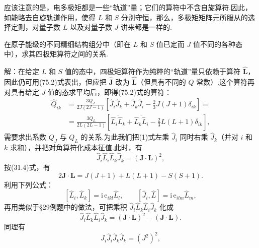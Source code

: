 应该注意的是，电多极矩都是一些“轨道”量；它们的算符中不含自旋算符.因此，如能略去自旋轨道作用，使得 $L$ 和 $S$ 分别守恒，那么，多极矩矩阵元所服从的选择定则，对量子数 $L$ 以及对量子数 $J$ 讲来都是一样的.

\begin{xiti}

\quad 在原子能级的不同精细结构组分中（即在 $L$ 和 $S$ 值已定而 $J$ 值不同的各种态中），求其四极矩算符之间的关系.

解：在给定 $L$ 和 $S$ 值的态中，四极矩算符作为纯粹的“轨道”量只依赖于算符 $\hat{\boldsymbol{L}}$，因此仍可用(75.2)式表出，但应把 $\hat{\boldsymbol{J}}$ 改为 $\hat{\boldsymbol{L}}$（但具有不同的 $Q$ 常数）.这个算符再对具有给定 $J$ 值的态求平均后，即得(75.2)式的算符：
\setcounter{equation}{0}\renewcommand{\theequation}{\arabic{equation}}%
\begin{equation}
\begin{aligned}
  \hat{Q}_{ik}&=\frac{3Q_J}{2J(2J-1)}
  \left[\hat{J}_i\hat{J}_k+\hat{J}_k\hat{J}_i-\frac{2}{3}J(J+1)\delta_{ik}\right]=\\
  &=\frac{3Q_L}{2L(2L-1)}
  \left[\overline{\hat{L}_i\hat{L}_k}+\overline{\hat{L}_k\hat{L}_i}
  -\frac{2}{3}L(L+1)\delta_{ik}\right],
\end{aligned}
\end{equation}
需要求出系数 $Q_J$ 与 $Q_L$ 的关系.为此我们把(1)式左乘 $\hat{J}_i$ 同时右乘 $\hat{J}_k$（并对 $i$ 和 $k$ 求和），并把对角算符化成本征值.此时，有
\begin{equation*}
  \hat{J}_i\hat{L}_i\hat{L}_k\hat{J}_k=(\boldsymbol{J}\cdot\boldsymbol{L})^{2},
\end{equation*}
按(31.4)式，有
\begin{equation*}
  2\boldsymbol{J}\cdot\boldsymbol{L}
  =J(J+1)+L(L+1)-S(S+1).
\end{equation*}
利用下列公式：
\begin{equation*}
  \left[\hat{L}_i,\hat{L}_k\right]=\mathrm{i}\,\mathrm{e}_{ikl}\hat{L}_l,
  \qquad
  \left[\hat{J}_i,\hat{L}\right]=\mathrm{i}\,\mathrm{e}_{ilm}\hat{L}_m,
\end{equation*}
再用类似于§29例题中的做法，可把乘积 $\hat{J}_i\hat{L}_k\hat{L}_i\hat{J}_k$ 化成
\begin{equation*}
  \hat{J}_i\hat{L}_k\hat{L}_i\hat{J}_k
  =(\boldsymbol{J}\cdot\boldsymbol{L})^{2}-(\boldsymbol{J}\cdot\boldsymbol{L}).
\end{equation*}
同理有
\begin{equation*}
  \hat{J}_i\hat{J}_i\hat{J}_k\hat{J}_k=(J^{2})^{2},

\end{equation*}
\end{xiti}
